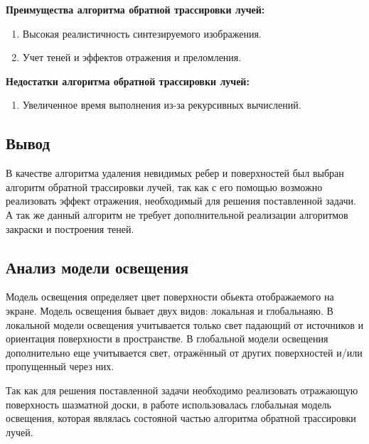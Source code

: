 \textbf{Преимущества алгоритма обратной трассировки лучей:}
\begin{enumerate}[label=\arabic*)]
	\item Высокая реалистичность синтезируемого изображения.
	\item Учет теней и эффектов отражения и преломления.
\end{enumerate}

\textbf{Недостатки алгоритма обратной трассировки лучей:}
\begin{enumerate}[label=\arabic*)]
	\item Увеличенное время выполнения из-за рекурсивных вычислений.
\end{enumerate}

\subsection*{Вывод}
В качестве алгоритма удаления невидимых ребер и поверхностей был выбран алгоритм обратной трассировки лучей, так как с его помощью возможно реализовать эффект отражения, необходимый для решения поставленной задачи. А так же данный алгоритм не требует дополнительной реализации алгоритмов закраски и построения теней.

\subsection{Анализ модели освещения}

Модель освещения определяет цвет поверхности обьекта отображаемого на экране. Модель освещения бывает двух видов: локальная и глобальнаяю. В локальной модели освещения учитывается только свет падающий от источников и ориентация поверхности в пространстве. В глобальной модели освещения дополнительно еще учитывается свет, отражённый от других поверхностей и/или пропущенный через них.

Так как для решения поставленной задачи необходимо реализовать отражающую поверхность шазматной доски, в работе использовалась глобальная модель освещения, которая являлась состояной частью алгоритма обратной трассировки лучей.




%




\clearpage
